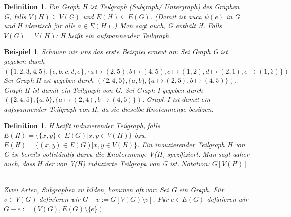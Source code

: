 \documentclass{beamer}
\newtheorem{defi}[satz]{Definition}
\newtheorem{beispiel}[satz]{Beispiel}
\begin{document}
  \begin{frame}
  \vfill
    \begin{center}
      \begin{defi}
        Ein Graph H ist Teilgraph (Subgraph/ Untergraph) des Graphen G, falls $V(H)\subseteq V(G)$ und $E(H)\subseteq E(G)$.
        (Damit ist auch $\psi(e)$ in G und H identisch für alle $a\in E(H)$.)
        Man sagt auch, G enthält H.
        Falls $V(G)= V(H)$: H heißt ein aufspannender Teilgraph.
      \end {defi}
    \end{center}
  \vfill
  \end{frame}

  \begin{frame}
  \vfill
    \begin{center}
      \begin{beispiel}
        Schauen wir uns das erste Beispiel erneut an:
        Sei Graph G ist gegeben durch $(\{1,2,3,4,5\}, \{a,b,c,d,e \}, \{a\mapsto  (2,5), b\mapsto (4,5), c\mapsto (1,2), d\mapsto (2,1), e\mapsto (1,3)\})$
    Sei Graph H ist gegeben durch $(\{2,4,5\}, \{a,b\}, \{a\mapsto  (2,5), b\mapsto (4,5)\})$. 
        Graph H ist damit ein Teilgraph von G.
        Sei Graph I gegeben durch $(\{2,4,5\}, \{a,b\}, \{a\mapsto  (2,4), b\mapsto (4,5)\}) $.
        Graph I ist damit ein aufspannender Teilgraph von H, da sie dieselbe Knotenmenge besitzen.
      \end {beispiel}
    \end{center}
  \vfill
  \end{frame}

  \begin{frame}
  \vfill
    \begin{center}
      \begin{defi}
        H heißt induzierender Teilgraph, falls $E(H)= \{\{x,y\}\in E(G)| x,y\in V(H)\}$ bzw. $E(H)= \{(x,y)\in E(G)| x,y\in V(H)\}$.
        Ein induzierender Teilgraph H von G ist bereits vollständig durch die Knotenmenge V(H) spezifiziert.
        Man sagt daher auch, dass H der von V(H) induzierte Teilgraph von G ist.
        Notation: $G[V(H)]$.

        Zwei Arten, Subgraphen zu bilden, kommen oft vor:
        Sei G ein Graph. Für $v\in V(G)$ definieren wir $G-v:= G[V(G)\setminus {v}]$.
        Für $e\in E(G)$ definieren wir $G-e:= (V(G), E(G)\setminus \{e\})$.
      \end{defi}
    \end{center}
  \vfill
  \end{frame}
\end{document}
